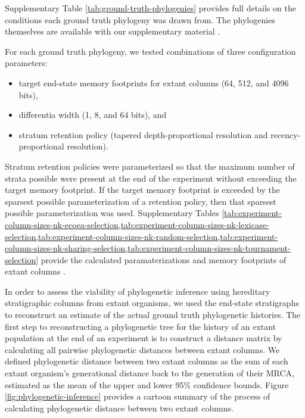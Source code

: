 Supplementary Table \ref{tab:ground-truth-phylogenies} provides full details on the conditions each ground truth phylogeny was drawn from.
The phylogenies themselves are available with our supplementary material \citep{moreno2022hstratconceptsupplement}.

For each ground truth phylogeny, we tested combinations of three configuration parameters:
\begin{itemize}
  \item target end-state memory footprints for extant columns (64, 512, and 4096 bits),
  \item differentia width (1, 8, and 64 bits), and
  \item stratum retention policy (tapered depth-proportional resolution and recency-proportional resolution).
\end{itemize}

Stratum retention policies were parameterized so that the maximum number of strata possible were present at the end of the experiment without exceeding the target memory footprint.
If the target memory footprint is exceeded by the sparsest possible parameterization of a retention policy, then that sparsest possible parameterization was used.
Supplementary Tables \cref{tab:experiment-column-sizes-nk-ecoea-selection,tab:experiment-column-sizes-nk-lexicase-selection,tab:experiment-column-sizes-nk-random-selection,tab:experiment-column-sizes-nk-sharing-selection,tab:experiment-column-sizes-nk-tournament-selection} provide the calculated paramaterizations and memory footprints of extant columns \citep{moreno2022hstratconceptsupplement}.



In order to assess the viability of phylogenetic inference using hereditary stratigraphic columns from extant organisms, we used the end-state stratigraphs to reconstruct an estimate of the actual ground truth phylogenetic histories.
The first step to reconstructing a phylogenetic tree for the history of an extant population at the end of an experiment is to construct a distance matrix by calculating all pairwise phylogenetic distances between extant columns.
We defined phylogenetic distance between two extant columns as the sum of each extant organism's generational distance back to the generation of their MRCA, estimated as the mean of the upper and lower 95\% confidence bounds.
Figure \ref{fig:phylogenetic-inference} provides a cartoon summary of the process of calculating phylogenetic distance between two extant columns.

